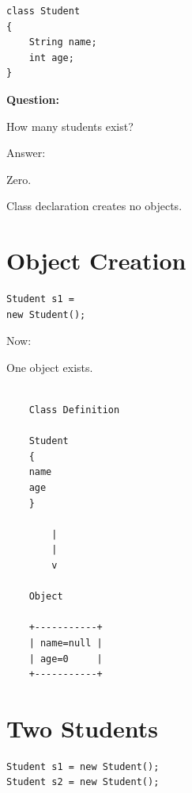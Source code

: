 \documentclass[11pt,a4paper]{book}
\begin{document}
\begin{verbatim}
class Student
{
    String name;
    int age;
}
\end{verbatim}


\textbf{Question:}

How many students exist?


Answer:

Zero.


Class declaration creates no objects.


\section{Object Creation}

\begin{verbatim}
Student s1 =
new Student();
\end{verbatim}


Now:

One object exists.


\begin{verbatim}

    Class Definition

    Student
    {
    name
    age
    }

        |
        |
        v

    Object

    +-----------+
    | name=null |
    | age=0     |
    +-----------+

\end{verbatim}


\section{Two Students}

\begin{verbatim}
Student s1 = new Student();
Student s2 = new Student();
\end{verbatim}
\end{document}
